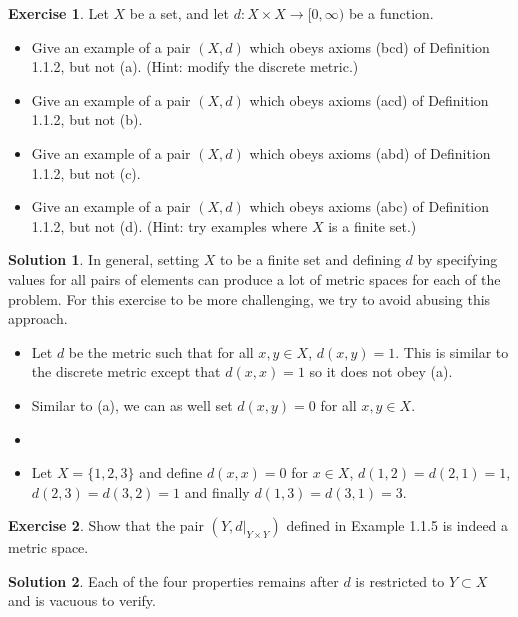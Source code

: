 \documentclass[13pt,a4paper]{report}
\theoremstyle{definition}
\newtheorem{exercise}{Exercise}[section]
\newtheorem{solution}{Solution}[section]
\begin{document}
\begin{exercise}
Let $X$ be a set, and let $d: X \times X \rightarrow [0, \infty)$ be a function.
\begin{itemize}
    \item[(a)] Give an example of a pair $(X, d)$ which obeys axioms (bcd) of Definition 1.1.2,
    but not (a). (Hint: modify the discrete metric.)
    \item[(b)] Give an example of a pair $(X, d)$ which obeys axioms (acd) of Definition 1.1.2,
    but not (b).
    \item[(c)] Give an example of a pair $(X, d)$ which obeys axioms (abd) of Definition 1.1.2,
    but not (c).
    \item[(d)] Give an example of a pair $(X, d)$ which obeys axioms (abc) of Definition 1.1.2,
    but not (d). (Hint: try examples where $X$ is a finite set.)
\end{itemize}
\end{exercise}

\begin{solution} In general, setting $X$ to be a finite set and defining $d$ by specifying values
for all pairs of elements can produce a lot of metric spaces for each of the problem. For this
exercise to be more challenging, we try to avoid abusing this approach.
\begin{itemize}
    \item[(a)] Let $d$ be the metric such that for all $x, y \in X$, $d(x, y) = 1$. This is similar
    to the discrete metric except that $d(x, x) = 1$ so it does not obey (a).
    \item[(b)] Similar to (a), we can as well set $d(x, y) = 0$ for all $x, y \in X$.
    \item[(c)]
    \item[(d)] Let $X = \{ 1, 2, 3 \}$ and define $d(x, x) = 0$ for $x \in X$, $d(1, 2) = d(2, 1)
    = 1$, $d(2, 3) = d(3, 2) = 1$ and finally $d(1, 3) = d(3, 1) = 3$.
\end{itemize}
\end{solution}

\begin{exercise}
Show that the pair $(Y, d|_{Y \times Y})$ defined in Example 1.1.5 is indeed a metric space.
\end{exercise}

\begin{solution}
Each of the four properties remains after $d$ is restricted to $Y \subset X$ and is vacuous to
verify.
\end{solution}
\end{document}

